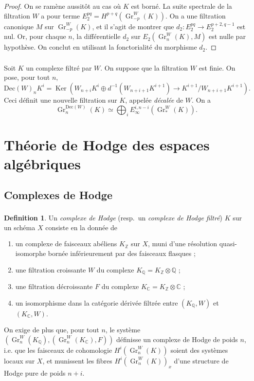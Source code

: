 \documentclass[11pt]{amsart}
\theoremstyle{plain}
\theoremstyle{definition}
\newtheorem{definition}[theorem]{Definition}
\DeclareMathOperator{\Gr}{Gr}
\DeclareMathOperator{\Ker}{Ker}
\newcommand{\CC}{\mathbb{C}}
\newcommand{\QQ}{\mathbb{Q}}
\newcommand{\ZZ}{\mathbb{Z}}
\begin{document}
\begin{proof}
On se ram\`ene aussit\^ot au cas o\`u $K$ est born\'e. La suite spectrale de la filtration $W$ a pour terme $E_2^{pq} = H^{p+q}(\Gr_{-p}^W(K))$. On a une filtration canonique $M$ sur $\Gr_{-p}^W(K)$, et il s'agit de montrer que $d_2 : E_2^{pq} \to E_2^{p+2,q-1}$ est nul. Or, pour chaque $n$, la diff\'erentielle $d_2$ sur $E_2(\Gr_n^W(K), M)$ est nulle par hypoth\`ese. On conclut en utilisant la fonctorialit\'e du morphisme $d_2$.
\end{proof}

\subsubsection{}
Soit $K$ un complexe filtr\'e par $W$. On suppose que la filtration $W$ est finie. On pose, pour tout $n$,
\[
\mathrm{Dec}(W)_n K^i = \Ker(W_{n+i} K^i \oplus d^{-1}(W_{n+i+1} K^{i+1}) \to K^{i+1}/W_{n+i+1} K^{i+1}).
\]
Ceci d\'efinit une nouvelle filtration sur $K$, appel\'ee \emph{d\'ecal\'ee} de $W$. On a
\[
\Gr_n^{\mathrm{Dec}(W)}(K) \simeq \bigoplus_i E_\infty^{i,n-i}(\Gr_*^W(K)).
\]

\section{Th\'eorie de Hodge des espaces alg\'ebriques}

\subsection{Complexes de Hodge}

\subsubsection{}
\begin{definition}
Un \emph{complexe de Hodge} (resp.\ un \emph{complexe de Hodge filtr\'e}) $K$ sur un sch\'ema $X$ consiste en la donn\'ee de
\begin{enumerate}
\item[(a)] un complexe de faisceaux ab\'eliens $K_\ZZ$ sur $X$, muni d'une r\'esolution quasi-isomorphe born\'ee inf\'erieurement par des faisceaux flasques ;
\item[(b)] une filtration croissante $W$ du complexe $K_\QQ = K_\ZZ \otimes \QQ$ ;
\item[(c)] une filtration d\'ecroissante $F$ du complexe $K_\CC = K_\ZZ \otimes \CC$ ;
\item[(d)] un isomorphisme dans la cat\'egorie d\'eriv\'ee filtr\'ee entre $(K_\QQ, W)$ et $(K_\CC, W)$.
\end{enumerate}
On exige de plus que, pour tout $n$, le syst\`eme $(\Gr_n^W(K_\QQ), (\Gr_n^W(K_\CC), F))$ d\'efinisse un complexe de Hodge de poids $n$, i.e. que les faisceaux de cohomologie $H^i(\Gr_n^W(K))$ soient des syst\`emes locaux sur $X$, et munissent les fibres $H^i(\Gr_n^W(K))_x$ d'une structure de Hodge pure de poids $n+i$.
\end{definition}
\end{document}
